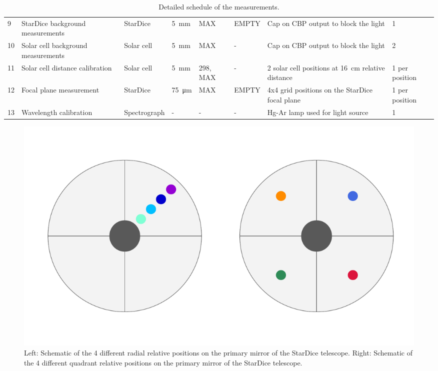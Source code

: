 \begin{table}[t]{}
\begin{tabular}{M{.25cm} M{2.25cm} M{1.75cm} M{1.1cm} M{1.75cm} M{3cm} M{3.5cm} M{1.25cm}}
         9 & StarDice background measurements & StarDice & \SI{5}{\milli\meter} & MAX & EMPTY & Cap on CBP output to block the light & 1 \\
            
         10 & Solar cell background measurements & Solar cell & \SI{5}{\milli\meter} & MAX & - & Cap on CBP output to block the light & 2 \\
            
         11 & Solar cell distance calibration & Solar cell & \SI{5}{\milli\meter} & 298, MAX & - & 2 solar cell positions at \SI{16}{\centi\meter} relative distance & 1 per position \\
            
         12 & Focal plane measurement & StarDice & \SI{75}{\micro\meter} & MAX & EMPTY & 4x4 grid positions on the StarDice focal plane & 1 per position \\
           
         13 & Wavelength calibration & Spectrograph & - & - & - & Hg-Ar lamp used for light source & 1 \\ 
         \hline
    \end{tabular}
    \caption{Detailed schedule of the measurements.}
    \label{tab:schedule}
\end{table}


\begin{figure}[!h]
\centering
\includegraphics[width=\columnwidth]{fig/8_mirror_positions.pdf}
\caption{Left: Schematic of the 4 different radial relative positions on the primary mirror of the StarDice telescope. Right: Schematic of the 4 different quadrant relative positions on the primary mirror of the StarDice telescope.}
\label{fig:8_mirror_positions}
\end{figure}

